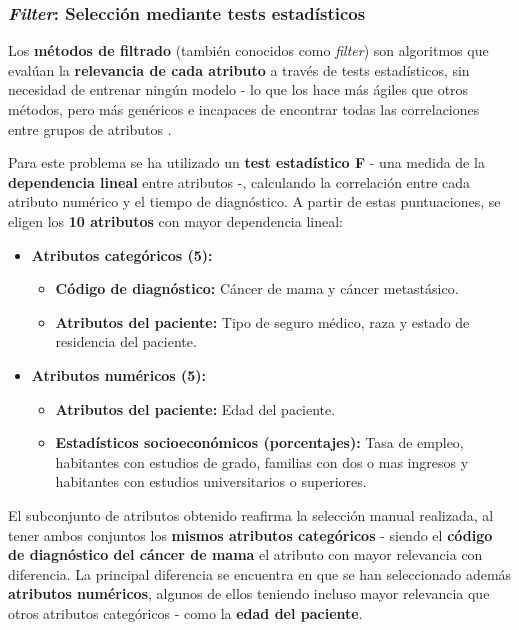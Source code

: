\subsubsection{\textit{Filter}: Selección mediante tests estadísticos}

Los \textbf{métodos de filtrado} (también conocidos como \textit{filter}) son algoritmos que evalúan la \textbf{relevancia de cada atributo} a través de tests estadísticos, sin necesidad de entrenar ningún modelo - lo que los hace más ágiles que otros métodos, pero más genéricos e incapaces de encontrar todas las correlaciones entre grupos de atributos \cite{featureselection}.

Para este problema se ha utilizado un \textbf{test estadístico F} - una medida de la \textbf{dependencia lineal} entre atributos -, calculando la correlación entre cada atributo numérico y el tiempo de diagnóstico. A partir de estas puntuaciones, se eligen los \textbf{10 atributos} con mayor dependencia lineal:

\begin{itemize}[parsep=1pt, itemsep=1pt, topsep=4pt]
	\item \textbf{Atributos categóricos (5):} 
	\begin{itemize}[parsep=1pt, itemsep=1pt, topsep=4pt]
		\item \textbf{Código de diagnóstico:} Cáncer de mama y cáncer metastásico.
		\item \textbf{Atributos del paciente:} Tipo de seguro médico, raza y estado de residencia del paciente.
	\end{itemize}
	\item \textbf{Atributos numéricos (5):}
	\begin{itemize}[parsep=1pt, itemsep=1pt, topsep=4pt]
		\item \textbf{Atributos del paciente:} Edad del paciente.
		\item \textbf{Estadísticos socioeconómicos (porcentajes):} Tasa de empleo, habitantes con estudios de grado, familias con dos o mas ingresos y habitantes con estudios universitarios o superiores.
	\end{itemize}
\end{itemize}

El subconjunto de atributos obtenido reafirma la selección manual realizada, al tener ambos conjuntos los \textbf{mismos atributos categóricos} - siendo el \textbf{código de diagnóstico del cáncer de mama} el atributo con mayor relevancia con diferencia. La principal diferencia se encuentra en que se han seleccionado además \textbf{atributos numéricos}, algunos de ellos teniendo incluso mayor relevancia que otros atributos categóricos - como la \textbf{edad del paciente}.

